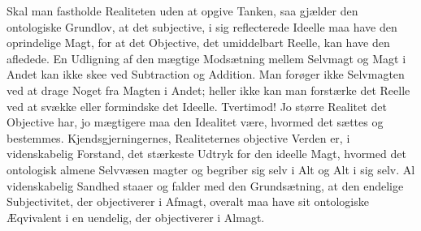 \documentclass[12pt]{article}
\newcommand{\opage}[1]{\marginnote{\footnotesize\textit{[#1]}}}
\begin{document}
Skal man fastholde Realiteten uden at opgive Tanken, saa gjælder
den ontologiske Grundlov, at det subjective, i sig reflecterede
Ideelle maa have den oprindelige Magt, for at det Objective, det
umiddelbart Reelle, kan have den afledede. En Udligning af den
mægtige Modsætning mellem Selvmagt og Magt i Andet kan ikke skee
ved Subtraction og Addition. Man forøger ikke Selvmagten ved at
drage Noget fra Magten i Andet; heller ikke kan man forstærke det
Reelle ved at svække eller formindske det Ideelle. Tvertimod! Jo
større Realitet det
\opage{38} Objective har, jo mægtigere maa den Idealitet være, hvormed det
sættes og bestemmes. Kjendsgjerningernes, Realiteternes objective
Verden er, i videnskabelig Forstand, det stærkeste Udtryk for den
ideelle Magt, hvormed det ontologisk almene Selvvæsen magter og
begriber sig selv i Alt og Alt i sig selv. Al videnskabelig Sandhed
staaer og falder med den Grundsætning, at den endelige
Subjectivitet, der objectiverer i Afmagt, overalt maa have sit
ontologiske Æqvivalent i en uendelig, der objectiverer i Almagt.
\end{document}
